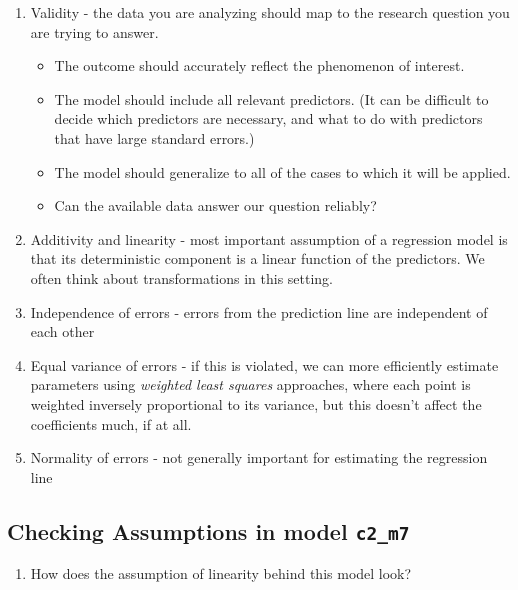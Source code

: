 \documentclass[]{book}
\providecommand{\tightlist}{%
  \setlength{\itemsep}{0pt}\setlength{\parskip}{0pt}}
\theoremstyle{definition}
\theoremstyle{definition}
\theoremstyle{definition}
\theoremstyle{remark}
\begin{document}
\begin{enumerate}
\def\labelenumi{\arabic{enumi}.}
\tightlist
\item
  Validity - the data you are analyzing should map to the research
  question you are trying to answer.

  \begin{itemize}
  \tightlist
  \item
    The outcome should accurately reflect the phenomenon of interest.
  \item
    The model should include all relevant predictors. (It can be
    difficult to decide which predictors are necessary, and what to do
    with predictors that have large standard errors.)
  \item
    The model should generalize to all of the cases to which it will be
    applied.
  \item
    Can the available data answer our question reliably?
  \end{itemize}
\item
  Additivity and linearity - most important assumption of a regression
  model is that its deterministic component is a linear function of the
  predictors. We often think about transformations in this setting.
\item
  Independence of errors - errors from the prediction line are
  independent of each other
\item
  Equal variance of errors - if this is violated, we can more
  efficiently estimate parameters using \emph{weighted least squares}
  approaches, where each point is weighted inversely proportional to its
  variance, but this doesn't affect the coefficients much, if at all.
\item
  Normality of errors - not generally important for estimating the
  regression line
\end{enumerate}

\subsection{\texorpdfstring{Checking Assumptions in model
\texttt{c2\_m7}}{Checking Assumptions in model c2\_m7}}\label{checking-assumptions-in-model-c2_m7}

\begin{enumerate}
\def\labelenumi{\arabic{enumi}.}
\tightlist
\item
  How does the assumption of linearity behind this model look?
\end{enumerate}
\end{document}
